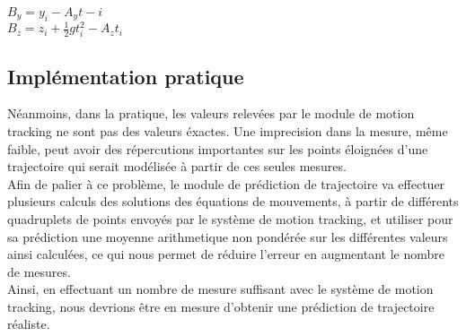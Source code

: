 $B_y = y_i - A_y t-i$\\

$B_z = z_i + \frac{1}{2} g t_i^2 - A_z t_i$\\

\subsection{Implémentation pratique}

Néanmoins, dans la pratique, les valeurs relevées par le module de motion tracking ne sont pas des valeurs éxactes. Une imprecision dans la mesure, même faible, peut avoir des répercutions importantes sur les points éloignées d'une trajectoire qui serait modélisée à partir de ces seules mesures.\\

Afin de palier à ce problème, le module de prédiction de trajectoire va effectuer plusieurs calculs des solutions des équations de mouvements, à partir de différents quadruplets de points envoyés par le système de motion tracking, et utiliser pour sa prédiction une moyenne arithmetique non pondérée sur les différentes valeurs ainsi calculées, ce qui nous permet de réduire l'erreur en augmentant le nombre de mesures. \\

Ainsi, en effectuant un nombre de mesure suffisant avec le système de motion tracking, nous devrions être en mesure d'obtenir une prédiction de trajectoire réaliste.
